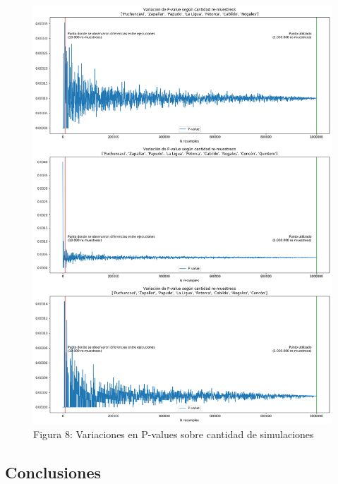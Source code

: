 \documentclass[]{article}
\begin{document}
\begin{figure}
\centering
\includegraphics{assets/variacion-p-values.png}
\caption{Figura 8: Variaciones en P-values sobre cantidad de simulaciones}
\end{figure}

\hypertarget{conclusiones}{%
\subsection{Conclusiones}\label{conclusiones}}
\end{document}
